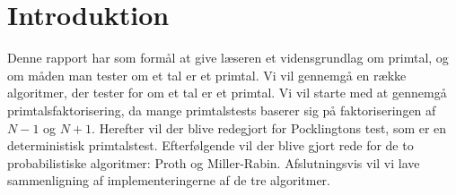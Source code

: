 \section{Introduktion}
Denne rapport har som formål at give læseren et vidensgrundlag om primtal, og om måden man tester 
om et tal er et primtal.
Vi vil gennemgå en række algoritmer, der tester for om et tal er et primtal. Vi vil starte med at 
gennemgå primtalsfaktorisering, da mange primtalstests baserer sig på faktoriseringen
af $N-1$ og $N+1$. Herefter vil der blive redegjort for Pocklingtons test, som er en deterministisk primtalstest.
Efterfølgende vil der blive gjort rede for de to probabilistiske algoritmer: Proth og Miller-Rabin.
Afslutningsvis vil vi lave sammenligning af implementeringerne af de tre algoritmer. 
